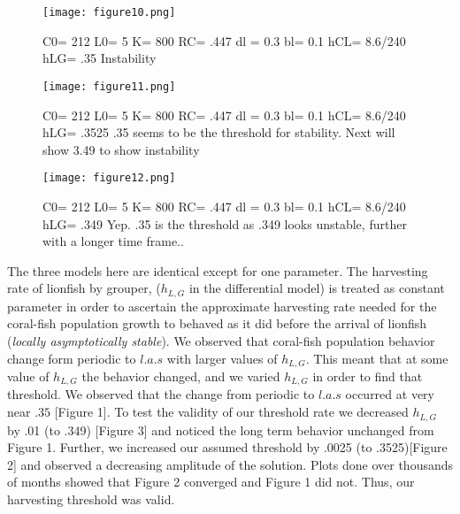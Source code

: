 \documentclass[11pt]{article}
\begin{document}
\begin{figure}[p]
\centering
\texttt{[image: figure10.png]}
\caption{
C0= 212
L0= 5
K= 800
RC=  .447
dl = 0.3
bl= 0.1
hCL=    8.6/240
hLG=  .35
Instability}
\end{figure}


\begin{figure}[p]
\centering
\texttt{[image: figure11.png]}
\caption{
C0= 212
L0= 5
K= 800
RC=  .447
dl = 0.3
bl= 0.1
hCL=    8.6/240
hLG=  .3525
.35 seems to be the threshold for stability. Next will show 3.49 to show instability}
\end{figure}




\begin{figure}[p]
\centering
\texttt{[image: figure12.png]}
\caption{
C0= 212
L0= 5
K= 800
RC=  .447
dl = 0.3
bl= 0.1
hCL=    8.6/240
hLG=  .349
Yep. .35 is the threshold as .349 looks unstable, further with a longer time frame..}
\end{figure}

The three models here are identical except for one parameter. The harvesting rate of lionfish by grouper, ($h_{L,G}$ in the differential model)  is treated as constant parameter in order to ascertain the approximate harvesting rate needed for the coral-fish population growth to behaved as it did before the arrival of lionfish ({\it locally asymptotically stable}). We observed that coral-fish population behavior change form periodic to $l.a.s$ with larger values of $h_{L,G}$.  This meant that at some value of $h_{L,G}$ the behavior changed, and we varied $h_{L,G}$ in order to find that threshold.  We observed that the change from periodic to $l.a.s$ occurred at very near $.35$ [Figure 1]. To test the validity of our threshold rate we decreased $h_{L,G}$ by .01 (to .349) [Figure 3] and noticed the long term behavior unchanged from Figure 1. Further, we increased our assumed threshold by .0025 (to .3525)[Figure 2] and observed a decreasing amplitude of the solution. Plots done over thousands of months showed that Figure 2 converged and Figure 1 did not. Thus, our harvesting threshold was valid. 
\end{document}
